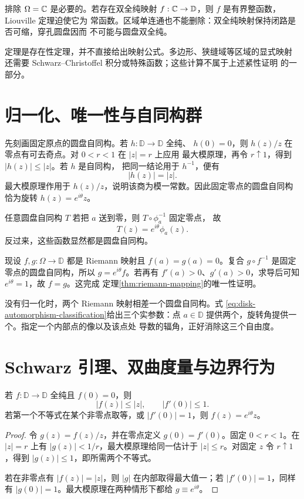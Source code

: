 排除 $\Omega=\mathbb{C}$ 是必要的。若存在双全纯映射
$f:\mathbb{C}\to\mathbb D$，则 $f$ 是有界整函数，Liouville 定理迫使它为
常函数。区域单连通也不能删除：双全纯映射保持闭路是否可缩，穿孔圆盘因而
不可能与圆盘双全纯。

定理是存在性定理，并不直接给出映射公式。多边形、狭缝域等区域的显式映射
还需要 Schwarz--Christoffel 积分或特殊函数；这些计算不属于上述紧性证明
的一部分。

\section{归一化、唯一性与自同构群}

先刻画固定原点的圆盘自同构。若 $h:\mathbb D\to\mathbb D$ 全纯、
$h(0)=0$，则 $h(z)/z$ 在零点有可去奇点。对 $0<r<1$ 在 $|z|=r$ 上应用
最大模原理，再令 $r\uparrow1$，得到 $|h(z)|\le|z|$。若 $h$ 是自同构，
把同一结论用于 $h^{-1}$，便有
\[
 |h(z)|=|z|.
\]
最大模原理作用于 $h(z)/z$，说明该商为模一常数。因此固定零点的圆盘自同构
恰为旋转 $h(z)=e^{i\theta}z$。

任意圆盘自同构 $T$ 若把 $a$ 送到零，则 $T\circ\phi_a^{-1}$ 固定零点，
故
\begin{equation}\label{eq:disk-automorphism-classification}
 T(z)=e^{i\theta}\phi_a(z).
\end{equation}
反过来，这些函数显然都是圆盘自同构。

现设 $f,g:\Omega\to\mathbb D$ 都是 Riemann 映射且
$f(a)=g(a)=0$。复合 $g\circ f^{-1}$ 是固定零点的圆盘自同构，所以
$g=e^{i\theta}f$。若再有 $f'(a)>0$、$g'(a)>0$，求导后可知
$e^{i\theta}=1$，故 $f=g$。这完成
定理\ref{thm:riemann-mapping}的唯一性证明。

没有归一化时，两个 Riemann 映射相差一个圆盘自同构。式
\eqref{eq:disk-automorphism-classification}给出三个实参数：点
$a\in\mathbb D$ 提供两个，旋转角提供一个。指定一个内部点的像以及该点处
导数的辐角，正好消除这三个自由度。

\section{Schwarz 引理、双曲度量与边界行为}

\begin{theorem}[Schwarz 引理]\label{thm:schwarz-lemma}
若 $f:\mathbb D\to\mathbb D$ 全纯且 $f(0)=0$，则
\[
 |f(z)|\le|z|,\qquad |f'(0)|\le1.
\]
若第一个不等式在某个非零点取等，或 $|f'(0)|=1$，则
$f(z)=e^{i\theta}z$。
\end{theorem}

\begin{proof}
令 $g(z)=f(z)/z$，并在零点定义 $g(0)=f'(0)$。固定 $0<r<1$。在
$|z|=r$ 上有 $|g(z)|<1/r$，最大模原理给同一估计于 $|z|\le r$。对固定
$z$ 令 $r\uparrow1$，得到 $|g(z)|\le1$，即所需两个不等式。

若在非零点有 $|f(z)|=|z|$，则 $|g|$ 在内部取得最大值一；若
$|f'(0)|=1$，同样有 $|g(0)|=1$。最大模原理在两种情形下都给
$g\equiv e^{i\theta}$。
\end{proof}


